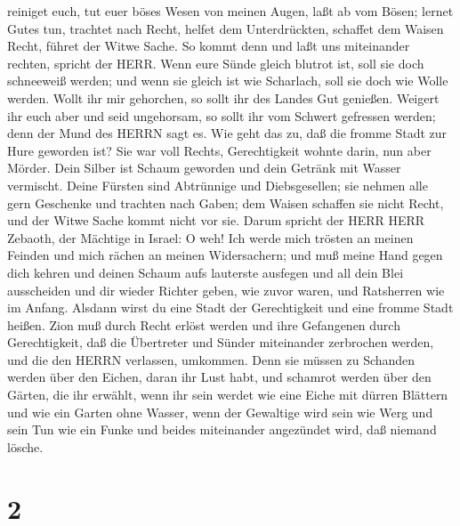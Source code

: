 reiniget euch, tut euer böses Wesen von meinen Augen, laßt ab vom Bösen;
 lernet Gutes tun, trachtet nach Recht, helfet dem
Unterdrückten, schaffet dem Waisen Recht, führet der Witwe Sache.
 So kommt denn und laßt uns miteinander rechten, spricht
der HERR. Wenn eure Sünde gleich blutrot ist, soll sie doch schneeweiß
werden; und wenn sie gleich ist wie Scharlach, soll sie doch wie Wolle
werden.  Wollt ihr mir gehorchen, so sollt ihr des Landes
Gut genießen.  Weigert ihr euch aber und seid ungehorsam,
so sollt ihr vom Schwert gefressen werden; denn der Mund des HERRN sagt
es.  Wie geht das zu, daß die fromme Stadt zur Hure
geworden ist? Sie war voll Rechts, Gerechtigkeit wohnte darin, nun aber
Mörder.  Dein Silber ist Schaum geworden und dein Getränk
mit Wasser vermischt.  Deine Fürsten sind Abtrünnige und
Diebsgesellen; sie nehmen alle gern Geschenke und trachten nach Gaben;
dem Waisen schaffen sie nicht Recht, und der Witwe Sache kommt nicht vor
sie.  Darum spricht der HERR HERR Zebaoth, der Mächtige in
Israel: O weh! Ich werde mich trösten an meinen Feinden und mich rächen
an meinen Widersachern;  und muß meine Hand gegen dich
kehren und deinen Schaum aufs lauterste ausfegen und all dein Blei
ausscheiden  und dir wieder Richter geben, wie zuvor waren,
und Ratsherren wie im Anfang. Alsdann wirst du eine Stadt der
Gerechtigkeit und eine fromme Stadt heißen.  Zion muß durch
Recht erlöst werden und ihre Gefangenen durch Gerechtigkeit,
 daß die Übertreter und Sünder miteinander zerbrochen
werden, und die den HERRN verlassen, umkommen.  Denn sie
müssen zu Schanden werden über den Eichen, daran ihr Lust habt, und
schamrot werden über den Gärten, die ihr erwählt,  wenn ihr
sein werdet wie eine Eiche mit dürren Blättern und wie ein Garten ohne
Wasser,  wenn der Gewaltige wird sein wie Werg und sein Tun
wie ein Funke und beides miteinander angezündet wird, daß niemand
lösche.

\hypertarget{section-1}{%
\section{2}\label{section-1}}

